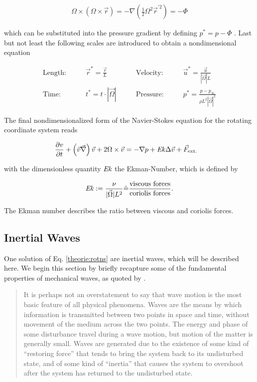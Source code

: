 \begin{align}
    \Omega \times (\Omega \times \vec{r}) = - \nabla \left(\frac{1}{2}\Omega^2\vec{r}^{'2}\right) = -\Phi
\end{align}

which can be substituted into the pressure gradient by defining $p^* = p - \Phi$ \citep{tritton88}.
\newpage
Last but not least the following scales are introduced to obtain a nondimensional equation

\begin{align}
    \text{Length:}\qquad &  \vec{r}^* = \frac{\vec{r}}{L}  &
    \qquad \text{Velocity:}\qquad& \vec{u}^* =  \frac{\vec{u}}{|\vec{\Omega}|L}\\
    \text{Time:}  \qquad & t^* = t \cdot |\vec{\Omega}| &
    \qquad  \text{Pressure:}\qquad & p^* = \frac{p - p_\infty}{\rho L^2{|\vec{\Omega}|}^2}
\end{align}

The final nondimensionalized form of the Navier-Stokes equation for the rotating coordinate system reads

\begin{align}
    \label{theorie:rotns}
    \pdn[v]{t}+ \left(\vec{v}  \vec{\nabla}\right) \vec{v} + 2\Omega \times \vec{v}  &= -  \nabla p + \Ekman \Delta \vec{v} + \vec{F}_{\text{ext.}}
\end{align}

with the dimensionless quantity $\mbox{\textit{Ek}}$ the Ekman-Number, which is defined by

\begin{align}
    \mbox{\textit{Ek}} := \frac{\nu}{|\vec{\Omega}| L^2} \hat{=} \frac{\text{viscous forces}}{\text{coriolis forces}}.
\end{align}

The Ekman number describes the ratio between viscous and coriolis forces.

\subsection{Inertial Waves}

One solution of Eq. \ref{theorie:rotns} are inertial waves, which will be described here.
We begin this section by briefly recapture some of the fundamental properties of mechanical waves, as quoted by \cite[p.194]{Kundu2012}.

\begin{quote}
It is perhaps not an overstatement to say that wave motion is the most basic feature
of all physical phenomena. Waves are the means by which information is transmitted
between two points in space and time, without movement of the medium across the
two points. The energy and phase of some disturbance travel during a wave motion,
but motion of the matter is generally small. Waves are generated due to the existence of
some kind of “restoring force” that tends to bring the system back to its undisturbed
state, and of some kind of “inertia” that causes the system to overshoot after the
system has returned to the undisturbed state.
\end{quote}

